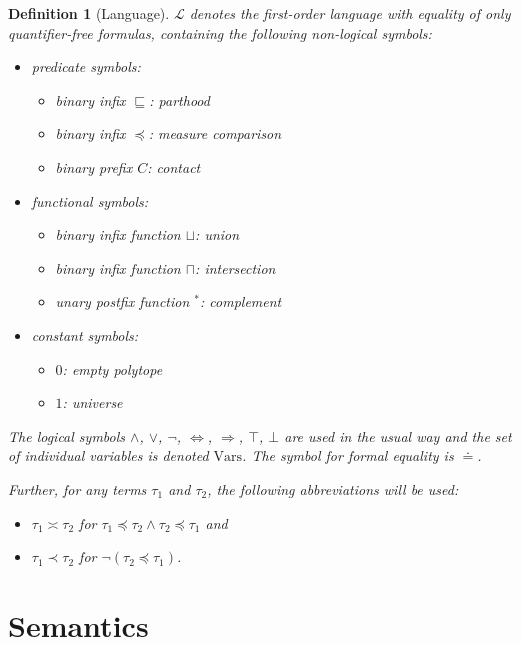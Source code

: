 \documentclass{article}
\newtheorem*{definition}{Definition}
\newcommand{\lang}{\mathcal{L}}
\newcommand{\Vars}{\text{Vars}}
\newcommand{\lcup}{\sqcup}
\newcommand{\lcap}{\sqcap}
\newcommand{\lstar}{^*}
\newcommand{\lpart}{\sqsubseteq}
\newcommand{\lparteq}{\doteq}
\newcommand{\lcont}{C}
\newcommand{\lmeasure}{\preceq}
\newcommand{\lmeasures}{\prec}
\newcommand{\lmeasureeq}{\asymp}
\begin{document}
\begin{definition}[Language]
$\lang$ denotes the first-order language with equality of only quantifier-free formulas, containing the following non-logical symbols:
\begin{itemize}
  \item predicate symbols:
  \begin{itemize}
  \item binary infix $\lpart$: parthood
  \item binary infix $\lmeasure$: measure comparison
  \item binary prefix $\lcont$: contact
  \end{itemize}
  \item functional symbols:
  \begin{itemize}
  \item binary infix function $\lcup$: union
  \item binary infix function $\lcap$: intersection
  \item unary postfix function $\lstar$: complement
  \end{itemize}
  \item constant symbols:
  \begin{itemize}
  \item $0$: empty polytope
  \item $1$: universe
  \end{itemize}
\end{itemize}

The logical symbols $\land$, $\lor$, $\lnot$, $\Leftrightarrow$, $\Rightarrow$, $\top$, $\bot$ are used in the usual way and the set of individual variables is denoted $\Vars$. The symbol for formal equality is $\lparteq$.

Further, for any terms $\tau_1$ and $\tau_2$, the following abbreviations will be used:
\begin{itemize}
\item $\tau_1 \lmeasureeq \tau_2$ for $\tau_1 \lmeasure \tau_2 \land \tau_2 \lmeasure \tau_1$ and
\item $\tau_1 \lmeasures \tau_2$ for $\lnot (\tau_2 \lmeasure \tau_1)$.
\end{itemize}

\end{definition}

\section{Semantics}
\end{document}

